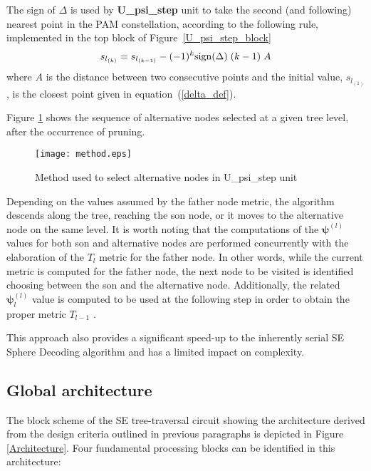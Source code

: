\documentclass[12pt,onecolumn,draftclsnofoot]{IEEEtran}
\begin{document}
The sign of $\Delta$ is used by \textbf{U\_psi\_step} unit to take the second
(and following) nearest point in the PAM constellation, according to the 
following rule, implemented in the top block of Figure~\ref{U_psi_step_block}
\begin{eqnarray}
s_{l_{(k)}} = s_{l_{(k-1)}} - (-1)^k {\rm sign}(\Delta) \; (k-1) \; A
\label{alternative_node}
\end{eqnarray}
\noindent where $A$ is the distance between two consecutive points and the initial value,
$s_{l_{(1)}}$, is the closest point given in equation~(\ref{delta_def}).

Figure \ref{method} shows the sequence of alternative 
nodes selected at a given tree level, after the occurrence of pruning.
\begin{figure}[t!]
    \begin{center}
    \texttt{[image: method.eps]} \caption{Method used to select alternative nodes in U\_psi\_step unit}
    \label{method}
    \end{center}
\end{figure}
Depending on the values assumed by the father node metric, the algorithm
descends along the tree, reaching the son node, or it moves to the 
alternative node on the same level.
It is worth noting that the computations of the $\boldsymbol \psi^{(l)}$ values for both
son and alternative nodes
are performed concurrently with the elaboration of the $T_l$ metric for the
father node.
In other words, while the current metric is computed for the father node,
the next node to be visited is identified choosing
between the son and the alternative node. Additionally, the
related $\boldsymbol \psi_l^{(l)}$ value is computed to be used at the following step
in order to obtain the proper metric $T_{l-1}$ .

This approach also provides a significant speed-up to the inherently
serial SE Sphere Decoding algorithm and  has a limited impact on
complexity.

\subsection{Global architecture}

The block scheme of the SE tree-traversal circuit showing the architecture 
derived from the design criteria outlined in previous paragraphs is depicted 
in Figure \ref{Architecture}.
Four fundamental processing blocks can be identified in this architecture:
\end{document}
